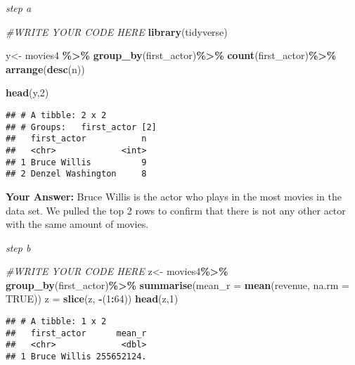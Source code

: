 \documentclass[
]{article}
\newenvironment{Shaded}{\begin{snugshade}}{\end{snugshade}}
\newcommand{\AttributeTok}[1]{\textcolor[rgb]{0.13,0.29,0.53}{#1}}
\newcommand{\CommentTok}[1]{\textcolor[rgb]{0.56,0.35,0.01}{\textit{#1}}}
\newcommand{\ConstantTok}[1]{\textcolor[rgb]{0.56,0.35,0.01}{#1}}
\newcommand{\DecValTok}[1]{\textcolor[rgb]{0.00,0.00,0.81}{#1}}
\newcommand{\FunctionTok}[1]{\textcolor[rgb]{0.13,0.29,0.53}{\textbf{#1}}}
\newcommand{\NormalTok}[1]{#1}
\newcommand{\OtherTok}[1]{\textcolor[rgb]{0.56,0.35,0.01}{#1}}
\newcommand{\SpecialCharTok}[1]{\textcolor[rgb]{0.81,0.36,0.00}{\textbf{#1}}}
\begin{document}
\emph{step a}

\begin{Shaded}
\begin{Highlighting}[]
\CommentTok{\#WRITE YOUR CODE HERE}
\FunctionTok{library}\NormalTok{(tidyverse)}

\NormalTok{y}\OtherTok{\textless{}{-}}\NormalTok{ movies4 }\SpecialCharTok{\%\textgreater{}\%}
  \FunctionTok{group\_by}\NormalTok{(first\_actor)}\SpecialCharTok{\%\textgreater{}\%}
  \FunctionTok{count}\NormalTok{(first\_actor)}\SpecialCharTok{\%\textgreater{}\%}
  \FunctionTok{arrange}\NormalTok{(}\FunctionTok{desc}\NormalTok{(n))}

\FunctionTok{head}\NormalTok{(y,}\DecValTok{2}\NormalTok{)}
\end{Highlighting}
\end{Shaded}

\begin{verbatim}
## # A tibble: 2 x 2
## # Groups:   first_actor [2]
##   first_actor           n
##   <chr>             <int>
## 1 Bruce Willis          9
## 2 Denzel Washington     8
\end{verbatim}

\textbf{Your Answer:} Bruce Willis is the actor who plays in the most
movies in the data set. We pulled the top 2 rows to confirm that there
is not any other actor with the same amount of movies.

\emph{step b}

\begin{Shaded}
\begin{Highlighting}[]
\CommentTok{\#WRITE YOUR CODE HERE}
\NormalTok{z}\OtherTok{\textless{}{-}}\NormalTok{ movies4}\SpecialCharTok{\%\textgreater{}\%}
  \FunctionTok{group\_by}\NormalTok{(first\_actor)}\SpecialCharTok{\%\textgreater{}\%}
  \FunctionTok{summarise}\NormalTok{(}\AttributeTok{mean\_r =} \FunctionTok{mean}\NormalTok{(revenue, }\AttributeTok{na.rm =} \ConstantTok{TRUE}\NormalTok{))}
\NormalTok{z }\OtherTok{=} \FunctionTok{slice}\NormalTok{(z, }\SpecialCharTok{{-}}\NormalTok{(}\DecValTok{1}\SpecialCharTok{:}\DecValTok{64}\NormalTok{))}
\FunctionTok{head}\NormalTok{(z,}\DecValTok{1}\NormalTok{)}
\end{Highlighting}
\end{Shaded}

\begin{verbatim}
## # A tibble: 1 x 2
##   first_actor      mean_r
##   <chr>             <dbl>
## 1 Bruce Willis 255652124.
\end{verbatim}
\end{document}
